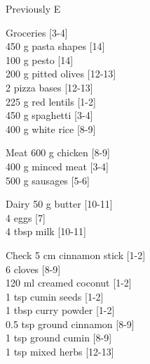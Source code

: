 \begin{menu}{Previously E}
\begin{shoppinglist}{Groceries}
        {\scriptsize[3-4]}\\
      450 g pasta shapes 
        {\scriptsize[14]}\\
      100 g pesto 
        {\scriptsize[14]}\\
      200 g pitted olives 
        {\scriptsize[12-13]}\\
      2  pizza bases 
        {\scriptsize[12-13]}\\
      225 g red lentils 
        {\scriptsize[1-2]}\\
      450 g spaghetti 
        {\scriptsize[3-4]}\\
      400 g white rice 
        {\scriptsize[8-9]}\\
      \end{shoppinglist}%
      \par\vfil %
      \begin{shoppinglist}{Meat}
      600 g chicken 
        {\scriptsize[8-9]}\\
      400 g minced meat 
        {\scriptsize[3-4]}\\
      500 g sausages 
        {\scriptsize[5-6]}\\
      \end{shoppinglist}%
      \begin{shoppinglist}{Dairy}
      50 g butter 
        {\scriptsize[10-11]}\\
      4  eggs 
        {\scriptsize[7]}\\
      4 tbsp milk 
        {\scriptsize[10-11]}\\
      \end{shoppinglist}%
      \par\vfil %
      \vfil\clearpage %
      \begin{shoppinglist}{Check}
      5 cm cinnamon stick 
        {\scriptsize[1-2]}\\
      6  cloves 
        {\scriptsize[8-9]}\\
      120 ml creamed coconut 
        {\scriptsize[1-2]}\\
      1 tsp cumin seeds 
        {\scriptsize[1-2]}\\
      1 tbsp curry powder 
        {\scriptsize[1-2]}\\
      0.5 tsp ground cinnamon 
        {\scriptsize[8-9]}\\
      1 tsp ground cumin 
        {\scriptsize[8-9]}\\
      1 tsp mixed herbs 
        {\scriptsize[12-13]}\\

\end{shoppinglist}
\end{menu}

